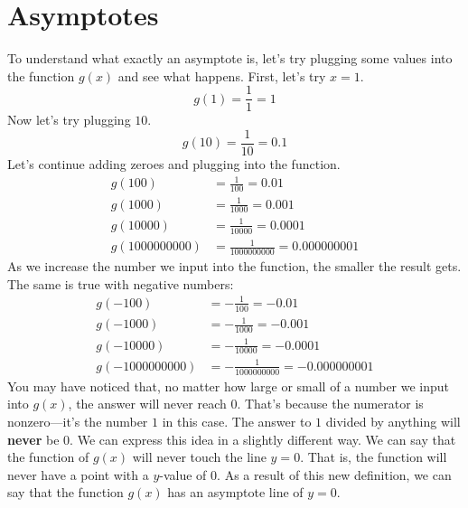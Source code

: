 \section{Asymptotes}
To understand what exactly an asymptote is, let's try plugging some values into the function $g(x)$ and see what happens. First, let's try $x = 1$.
\[
    g(1) = \frac{1}{1} = 1
\]
Now let's try plugging $10$.
\[
    g(10) = \frac{1}{10} = 0.1
\]
Let's continue adding zeroes and plugging into the function.
\[
\begin{aligned}
    g(100) &= \frac{1}{100} = 0.01 \\
    g(1000) &= \frac{1}{1000} = 0.001 \\
    g(10000) &= \frac{1}{10000} = 0.0001 \\
    g(1000000000) &= \frac{1}{1000000000} = 0.000000001
\end{aligned}
\]
As we increase the number we input into the function, the smaller the result gets. The same is true with negative numbers:
\[
\begin{aligned}
    g(-100) &= -\frac{1}{100} = -0.01 \\
    g(-1000) &= -\frac{1}{1000} = -0.001 \\
    g(-10000) &= -\frac{1}{10000} = -0.0001 \\
    g(-1000000000) &= -\frac{1}{1000000000} = -0.000000001
\end{aligned}
\]
You may have noticed that, no matter how large or small of a number we input into $g(x)$, the answer will never reach $0$. That's because the numerator is nonzero---it's the number $1$ in this case. The answer to $1$ divided by anything will \textbf{never} be $0$. We can express this idea in a slightly different way. We can say that the function of $g(x)$ will never touch the line $y = 0$. That is, the function will never have a point with a $y$-value of $0$. As a result of this new definition, we can say that the function $g(x)$ has an asymptote line of $y = 0$.

